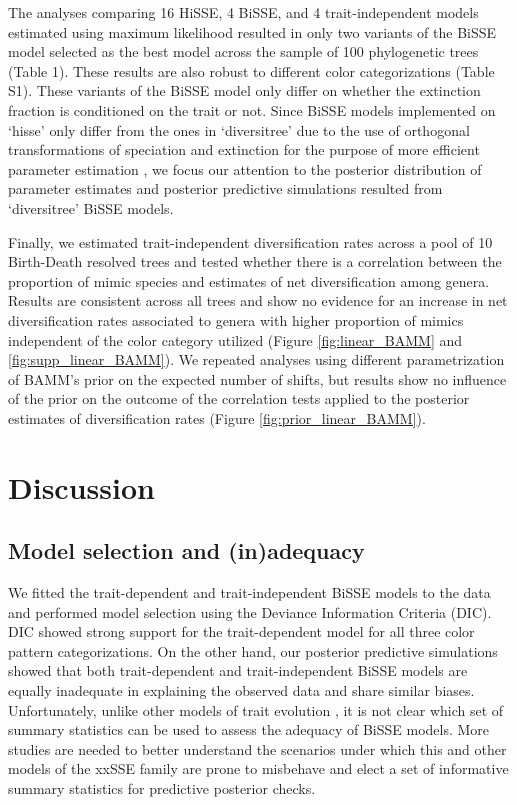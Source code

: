 The analyses comparing 16 HiSSE, 4 BiSSE, and 4 trait-independent models estimated using maximum likelihood resulted in only two variants of the BiSSE model selected as the best model across the sample of 100 phylogenetic trees (Table 1). These results are also robust to different color categorizations (Table S1). These variants of the BiSSE model only differ on whether the extinction fraction is conditioned on the trait or not. Since BiSSE models implemented on `hisse' \citep{beaulieu_detecting_2016} only differ from the ones in `diversitree' \citep{fitzjohn_2012} due to the use of orthogonal transformations of speciation and extinction for the purpose of more efficient parameter estimation \citep{beaulieu_detecting_2016}, we focus our attention to the posterior distribution of parameter estimates and posterior predictive simulations resulted from `diversitree' BiSSE models.

Finally, we estimated trait-independent diversification rates across a pool of 10 Birth-Death resolved trees and tested whether there is a correlation between the proportion of mimic species and estimates of net diversification among genera. Results are consistent across all trees and show no evidence for an increase in net diversification rates associated to genera with higher proportion of mimics independent of the color category utilized (Figure \ref{fig:linear_BAMM} and \ref{fig:supp_linear_BAMM}). We repeated analyses using different parametrization of BAMM's prior on the expected number of shifts, but results show no influence of the prior on the outcome of the correlation tests applied to the posterior estimates of diversification rates (Figure \ref{fig:prior_linear_BAMM}).

\section{Discussion}

\subsection{Model selection and (in)adequacy}

We fitted the trait-dependent and trait-independent BiSSE models to the data and performed model selection using the Deviance Information Criteria (DIC). DIC showed strong support for the trait-dependent model for all three color pattern categorizations. On the other hand, our posterior predictive simulations showed that both trait-dependent and trait-independent BiSSE models are equally inadequate in explaining the observed data and share similar biases. Unfortunately, unlike other models of trait evolution \citep{pennell_2015}, it is not clear which set of summary statistics can be used to assess the adequacy of BiSSE models. More studies are needed to better understand the scenarios under which this and other models of the xxSSE family are prone to misbehave and elect a set of informative summary statistics for predictive posterior checks.

